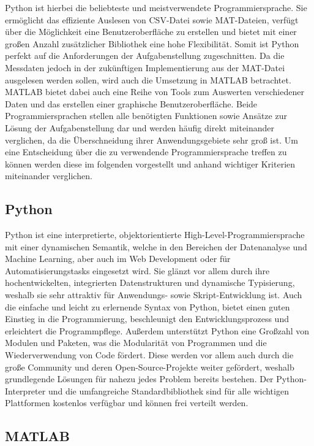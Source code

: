 Python ist hierbei die beliebteste und meistverwendete Programmiersprache.\cite{dataSciLang} Sie ermöglicht das effiziente Auslesen von CSV-Datei sowie MAT-Dateien, verfügt über die Möglichkeit eine Benutzeroberfläche zu erstellen und bietet mit einer großen Anzahl zusätzlicher Bibliothek eine hohe Flexibilität. Somit ist Python perfekt auf die Anforderungen der Aufgabenstellung zugeschnitten. Da die Messdaten jedoch in der zukünftigen Implementierung aus der MAT-Datei ausgelesen werden sollen, wird auch die Umsetzung in MATLAB betrachtet. MATLAB bietet dabei auch eine Reihe von Tools zum Auswerten verschiedener Daten und das erstellen einer graphische Benutzeroberfläche. Beide Programmiersprachen stellen alle benötigten Funktionen sowie Ansätze zur Lösung der Aufgabenstellung dar und werden häufig direkt miteinander verglichen, da die Überschneidung ihrer Anwendungsgebiete sehr groß ist. Um eine Entscheidung über die zu verwendende Programmiersprache treffen zu können werden diese im folgenden vorgestellt und anhand wichtiger Kriterien miteinander verglichen.

\subsection{Python}

Python ist eine interpretierte, objektorientierte High-Level-Programmiersprache mit einer dynamischen Semantik, welche in den Bereichen der Datenanalyse und Machine Learning, aber auch im Web Development oder für Automatisierungstasks eingesetzt wird. Sie glänzt vor allem durch ihre hochentwickelten, integrierten Datenstrukturen und dynamische Typisierung, weshalb sie sehr attraktiv für Anwendungs- sowie Skript-Entwicklung ist. Auch die einfache und leicht zu erlernende Syntax von Python, bietet einen guten Einstieg in die Programmierung, beschleunigt den Entwicklungsprozess und erleichtert die Programmpflege. Außerdem unterstützt Python eine Großzahl von Modulen und Paketen, was die Modularität von Programmen und die Wiederverwendung von Code fördert. Diese werden vor allem auch durch die große Community und deren Open-Source-Projekte weiter gefördert, weshalb grundlegende Lösungen für nahezu jedes Problem bereits bestehen. Der Python-Interpreter und die umfangreiche Standardbibliothek sind für alle wichtigen Plattformen kostenlos verfügbar und können frei verteilt werden.\cite{whatIsPython}\cite{pythonBeginners}

\subsection{MATLAB}

